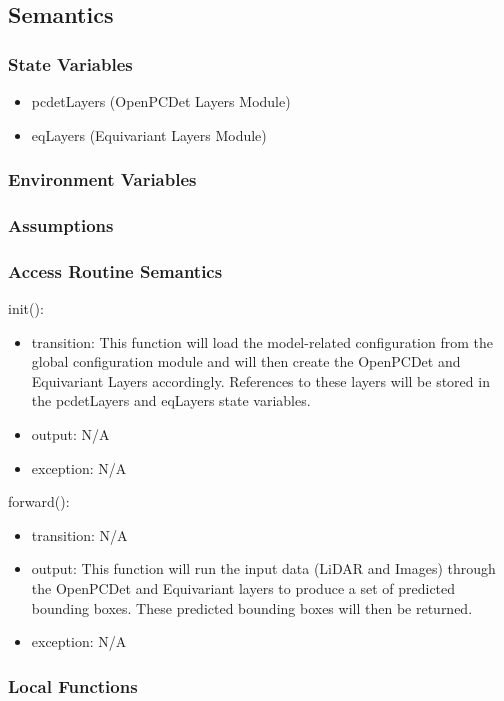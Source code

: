 \documentclass[12pt, titlepage]{article}
\begin{document}
\subsection{Semantics}

\subsubsection{State Variables}
\begin{itemize}
  \item pcdetLayers (OpenPCDet Layers Module)
  \item eqLayers (Equivariant Layers Module)
\end{itemize}

\subsubsection{Environment Variables}


\subsubsection{Assumptions}

\subsubsection{Access Routine Semantics}
\noindent init():
\begin{itemize}
\item transition: This function will load the model-related configuration from the global configuration module and will then create the OpenPCDet and Equivariant Layers accordingly. References to these layers will be stored in the pcdetLayers and eqLayers state variables. 
\item output: N/A
\item exception: N/A
\end{itemize}

\noindent forward():
\begin{itemize}
\item transition: N/A 
\item output: This function will run the input data (LiDAR and Images) through the OpenPCDet and Equivariant layers to produce a set of predicted bounding boxes. These predicted bounding boxes will then be returned. 
\item exception: N/A
\end{itemize}

\subsubsection{Local Functions}
\end{document}
